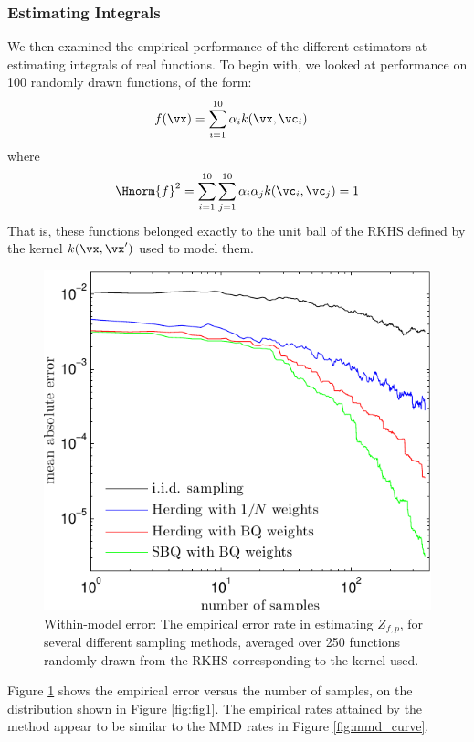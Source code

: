 \subsubsection{Estimating Integrals}


We then examined the empirical performance of the different estimators at estimating integrals of real functions.  To begin with, we looked at performance on 100 randomly drawn functions, of the form:
%
\begin{align}
f(\vx) & = \sum_{i=1}^{10} \alpha_i k(\vx, \vc_i)
\end{align}
%
where
\begin{align}
\Hnorm{f}^2 = \sum_{i=1}^{10} \sum_{j=1}^{10} \alpha_i \alpha_j k(\vc_i, \vc_j) = 1
\end{align}
%
That is, these functions belonged exactly to the unit ball of the RKHS defined by the kernel $k(\vx, \vx')$ used to model them.
%
\begin{figure}
\includegraphics[width=\columnwidth]{figs/herding/error_curve_rkhs_400_v4}
\caption[Empirical error of Bayesian quadrature, herding and random sampling]{Within-model error: The empirical error rate in estimating $Z_{f,p}$, for several different sampling methods, averaged over 250 functions randomly drawn from the RKHS corresponding to the kernel used.}
\label{fig:error_curve}
\end{figure}
%
Figure \ref{fig:error_curve} shows the empirical error versus the number of samples, on the distribution shown in Figure \ref{fig:fig1}.  The empirical rates attained by the method appear to be similar to the MMD rates in Figure \ref{fig:mmd_curve}.


